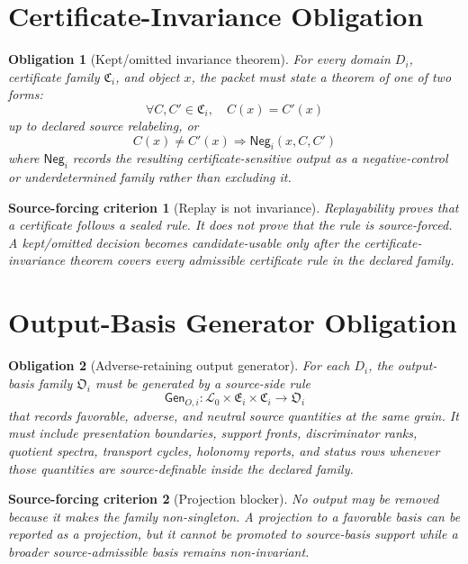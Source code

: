 \documentclass[11pt]{article}
\newcommand{\Lang}{\mathcal{L}_{0}}
\newcommand{\EnumFam}{\mathfrak{E}}
\newcommand{\CertFam}{\mathfrak{C}}
\newcommand{\OutFam}{\mathfrak{O}}
\newcommand{\Neg}{\mathsf{Neg}}
\newtheorem{criterion}{Source-forcing criterion}
\newtheorem{obligation}{Obligation}
\begin{document}
\section{Certificate-Invariance Obligation}

\begin{obligation}[Kept/omitted invariance theorem]
For every domain \(D_i\), certificate family \(\CertFam_i\), and object
\(x\), the packet must state a theorem of one of two forms:
\[
\forall C,C'\in\CertFam_i,\quad C(x)=C'(x)
\]
up to declared source relabeling, or
\[
C(x)\neq C'(x)\Rightarrow
\Neg_i(x,C,C')
\]
where \(\Neg_i\) records the resulting certificate-sensitive output as a
negative-control or underdetermined family rather than excluding it.
\end{obligation}

\begin{criterion}[Replay is not invariance]
Replayability proves that a certificate follows a sealed rule. It does not
prove that the rule is source-forced. A kept/omitted decision becomes
candidate-usable only after the certificate-invariance theorem covers every
admissible certificate rule in the declared family.
\end{criterion}

\section{Output-Basis Generator Obligation}

\begin{obligation}[Adverse-retaining output generator]
For each \(D_i\), the output-basis family \(\OutFam_i\) must be generated by
a source-side rule
\[
\mathsf{Gen}_{O,i}:\Lang\times \EnumFam_i\times\CertFam_i
\longrightarrow \OutFam_i
\]
that records favorable, adverse, and neutral source quantities at the same
grain. It must include presentation boundaries, support fronts,
discriminator ranks, quotient spectra, transport cycles, holonomy reports,
and status rows whenever those quantities are source-definable inside the
declared family.
\end{obligation}

\begin{criterion}[Projection blocker]
No output may be removed because it makes the family non-singleton. A
projection to a favorable basis can be reported as a projection, but it
cannot be promoted to source-basis support while a broader source-admissible
basis remains non-invariant.
\end{criterion}
\end{document}
